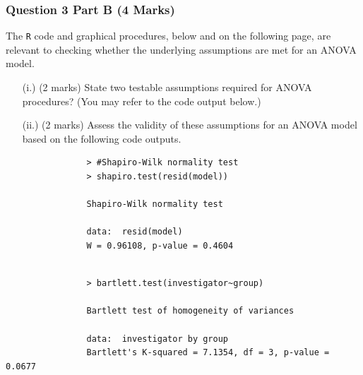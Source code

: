 \documentclass[a4paper,12pt]{article}
\begin{document}
	\newpage
	\large{
		\subsubsection*{Question 3 Part B (4 Marks)}
		The \texttt{R} code and graphical procedures, below and on the following page, are relevant to checking whether the underlying assumptions are met for an ANOVA model.
		\begin{itemize}
			\item[(i.)] (2 marks) State two testable assumptions required for ANOVA procedures? (You may refer to the code output below.)
			\item[(ii.)] (2 marks)  Assess the validity of these assumptions for an ANOVA model based on the following code outputs.
			
		\end{itemize}
		{
			\normalsize
			\begin{framed}
				\begin{verbatim}
				> #Shapiro-Wilk normality test
				> shapiro.test(resid(model))
				
				Shapiro-Wilk normality test
				
				data:  resid(model)
				W = 0.96108, p-value = 0.4604
				
				\end{verbatim}
			\end{framed}
			\begin{framed}
				\begin{verbatim}
				> bartlett.test(investigator~group)
				
				Bartlett test of homogeneity of variances
				
				data:  investigator by group
				Bartlett's K-squared = 7.1354, df = 3, p-value = 0.0677
				
				\end{verbatim}
			\end{framed}
		}
	}
	\newpage
	
\end{document}
